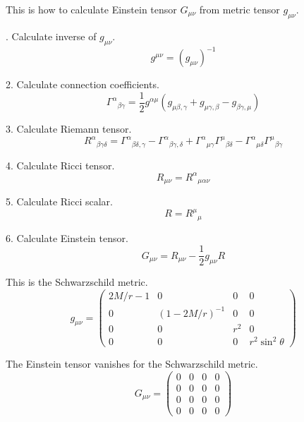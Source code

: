 \documentclass[12pt]{article}
\begin{document}
This is how to calculate Einstein tensor $G_{\mu\nu}$ from metric tensor $g_{\mu\nu}$.

. Calculate inverse of $g_{\mu\nu}$.
\begin{equation*}
g^{\mu\nu}=(g_{\mu\nu})^{-1}
\end{equation*}

2. Calculate connection coefficients.
\begin{equation*}
\Gamma^\alpha{}_{\beta\gamma}=\frac{1}{2}
g^{\alpha\mu}(g_{\mu\beta,\gamma}+g_{\mu\gamma,\beta}-g_{\beta\gamma,\mu})
\end{equation*}

3. Calculate Riemann tensor.
\begin{equation*}
R^\alpha{}_{\beta\gamma\delta}
=\Gamma^\alpha{}_{\beta\delta,\gamma}
-\Gamma^\alpha{}_{\beta\gamma,\delta}
+\Gamma^\alpha{}_{\mu\gamma}\Gamma^\mu{}_{\beta\delta}
-\Gamma^\alpha{}_{\mu\delta}\Gamma^\mu{}_{\beta\gamma}
\end{equation*}

4. Calculate Ricci tensor.
\begin{equation*}
R_{\mu\nu}=R^\alpha{}_{\mu\alpha\nu}
\end{equation*}

5. Calculate Ricci scalar.
\begin{equation*}
R=R^\mu{}_\mu
\end{equation*}

6. Calculate Einstein tensor.
\begin{equation*}
G_{\mu\nu}=R_{\mu\nu}-\frac{1}{2}g_{\mu\nu}R
\end{equation*}

This is the Schwarzschild metric.
\begin{equation*}
g_{\mu\nu}=\begin{pmatrix}
2M/r-1 & 0 & 0 & 0
\\
0 & (1 - 2M/r)^{-1} & 0 & 0
\\
0 & 0 & r^2 & 0
\\
0 & 0 & 0 & r^2\sin^2\theta
\end{pmatrix}
\end{equation*}

The Einstein tensor vanishes for the Schwarzschild metric.
\begin{equation*}
G_{\mu\nu}=\begin{pmatrix}
0 & 0 & 0 & 0
\\
0 & 0 & 0 & 0
\\
0 & 0 & 0 & 0
\\
0 & 0 & 0 & 0
\end{pmatrix}
\end{equation*}
\end{document}
